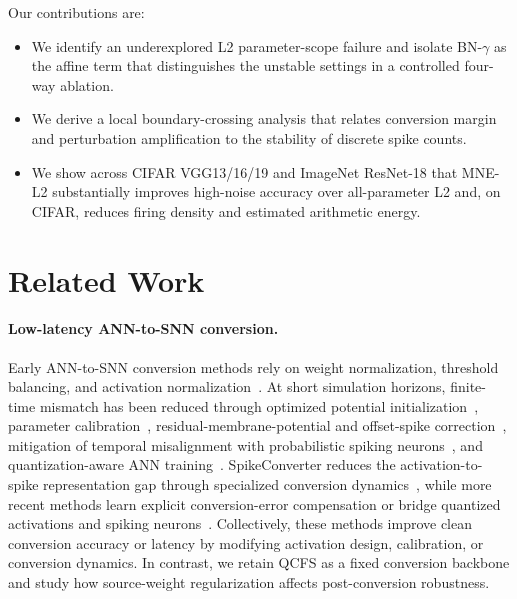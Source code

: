 \documentclass{article}
\begin{document}
Our contributions are:
\begin{itemize}
    \item We identify an underexplored L2 parameter-scope failure and isolate BN-$\gamma$ as the affine term that distinguishes the unstable settings in a controlled four-way ablation.
    \item We derive a local boundary-crossing analysis that relates conversion margin and perturbation amplification to the stability of discrete spike counts.
    \item We show across CIFAR VGG13/16/19 and ImageNet ResNet-18 that MNE-L2 substantially improves high-noise accuracy over all-parameter L2 and, on CIFAR, reduces firing density and estimated arithmetic energy.
\end{itemize}

\section{Related Work}

\paragraph{Low-latency ANN-to-SNN conversion.}
Early ANN-to-SNN conversion methods rely on weight normalization, threshold balancing, and activation normalization~\cite{diehl2015fast,rueckauer2017conversion}. At short simulation horizons, finite-time mismatch has been reduced through optimized potential initialization~\cite{bu2022optimized}, parameter calibration~\cite{li2021free}, residual-membrane-potential and offset-spike correction~\cite{hao2023reducing,hao2023bridging}, mitigation of temporal misalignment with probabilistic spiking neurons~\cite{bojkovic2025temporal}, and quantization-aware ANN training~\cite{hu2023fast,bu2022optimal}. SpikeConverter reduces the activation-to-spike representation gap through specialized conversion dynamics~\cite{liu2022spikeconverter}, while more recent methods learn explicit conversion-error compensation or bridge quantized activations and spiking neurons~\cite{liu2025efficient,yang2025neubridge}. Collectively, these methods improve clean conversion accuracy or latency by modifying activation design, calibration, or conversion dynamics. In contrast, we retain QCFS as a fixed conversion backbone and study how source-weight regularization affects post-conversion robustness.
\end{document}
